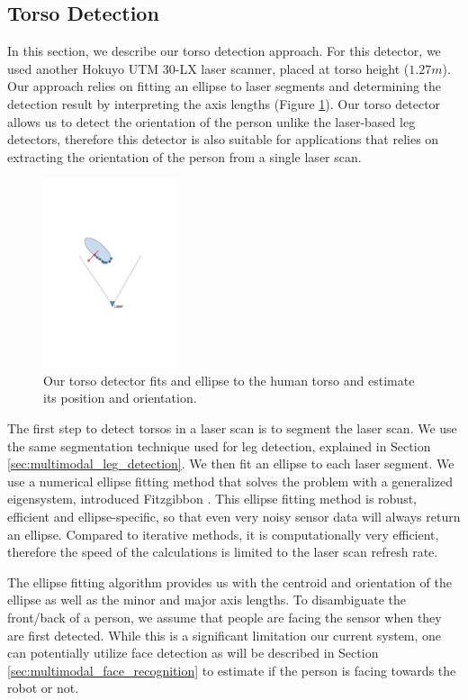 \subsection{Torso Detection}
\label{sec:multimodal_torso_detection}

In this section, we describe our torso detection approach. For this detector, we used another Hokuyo UTM 30-LX laser scanner, placed at torso height ($1.27m$). Our approach relies on fitting an ellipse to laser segments and determining the detection result by interpreting the axis lengths (Figure \ref{fig:ellipse}). Our torso detector allows us to detect the orientation of the person unlike the laser-based leg detectors, therefore this detector is also suitable for applications that relies on extracting the orientation of the person from a single laser scan. 

\begin{figure}[ht!]
\centering
\includegraphics[width=0.35\textwidth]{pics/ellipse}
\caption{Our torso detector fits and ellipse to the human torso and estimate its position and orientation.}
\label{fig:ellipse}
\end{figure}

The first step to detect torsos in a laser scan is to segment the laser scan. We use the same segmentation technique used for leg detection, explained in Section \ref{sec:multimodal_leg_detection}. We then fit an ellipse to each laser segment. We use a numerical ellipse fitting method that solves the problem with a generalized eigensystem, introduced Fitzgibbon \cite{fitzgibbon1999direct}. This ellipse fitting method is robust, efficient and ellipse-specific, so that even very noisy sensor data will always return an ellipse. Compared to iterative methods, it is computationally very efficient, therefore the speed of the calculations is limited to the laser scan refresh rate.

The ellipse fitting algorithm provides us with the centroid and orientation of the ellipse as well as the minor and major axis lengths. To disambiguate the front/back of a person, we assume that people are facing the sensor when they are first detected. While this is a significant limitation our current system, one can potentially utilize face detection as will be described in Section \ref{sec:multimodal_face_recognition} to estimate if the person is facing towards the robot or not.

